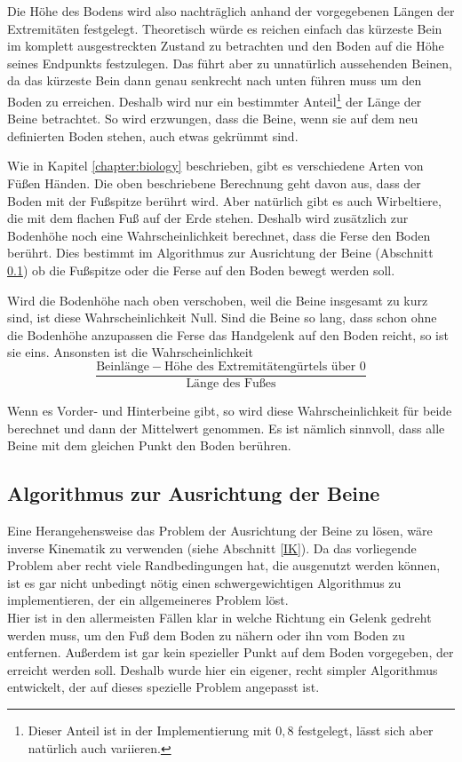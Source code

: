 Die Höhe des Bodens wird also nachträglich anhand der vorgegebenen Längen der Extremitäten festgelegt.
Theoretisch würde es reichen einfach das kürzeste Bein im komplett ausgestreckten Zustand zu betrachten und den Boden auf die Höhe seines Endpunkts festzulegen.
Das führt aber zu unnatürlich aussehenden Beinen, da das kürzeste Bein dann genau senkrecht nach unten führen muss um den Boden zu erreichen.
Deshalb wird nur ein bestimmter Anteil\footnote{Dieser Anteil ist in der Implementierung mit $0{,}8$ festgelegt, lässt sich aber natürlich auch variieren.} der Länge der Beine betrachtet. So wird erzwungen, dass die Beine, wenn sie auf dem neu definierten Boden stehen, auch etwas gekrümmt sind.

Wie in Kapitel \ref{chapter:biology} beschrieben, gibt es verschiedene Arten von Füßen \bzw Händen. Die oben beschriebene Berechnung geht davon aus, dass der Boden mit der Fußspitze berührt wird. Aber natürlich gibt es auch Wirbeltiere, die mit dem flachen Fuß auf der Erde stehen.
Deshalb wird zusätzlich zur Bodenhöhe noch eine Wahrscheinlichkeit berechnet, dass die Ferse den Boden berührt. Dies bestimmt im Algorithmus zur Ausrichtung der Beine (Abschnitt \ref{leg_algo}) ob die Fußspitze oder die Ferse auf den Boden bewegt werden soll.

Wird die Bodenhöhe nach oben verschoben, weil die Beine insgesamt zu kurz sind, ist diese Wahrscheinlichkeit Null.
Sind die Beine so lang, dass schon ohne die Bodenhöhe anzupassen die Ferse \bzw das Handgelenk auf den Boden reicht, so ist sie eins.
Ansonsten ist die Wahrscheinlichkeit 
\[\frac{\text{Beinlänge} - \text{Höhe des Extremitätengürtels über }0}{\text{Länge des Fußes}}\]

Wenn es Vorder- und Hinterbeine gibt, so wird diese Wahrscheinlichkeit für beide berechnet und dann der Mittelwert genommen. Es ist nämlich sinnvoll, dass alle Beine mit dem gleichen Punkt den Boden berühren.


\subsection{Algorithmus zur Ausrichtung der Beine}
\label{leg_algo}

Eine Herangehensweise das Problem der Ausrichtung der Beine zu lösen, wäre inverse Kinematik zu verwenden (siehe Abschnitt \ref{IK}). 
Da das vorliegende Problem aber recht viele Randbedingungen hat, die ausgenutzt werden können, ist es gar nicht unbedingt nötig einen schwergewichtigen Algorithmus zu implementieren, der ein allgemeineres Problem löst.\\
Hier ist \zb in den allermeisten Fällen klar in welche Richtung ein Gelenk gedreht werden muss, um den Fuß dem Boden zu nähern oder ihn vom Boden zu entfernen. Außerdem ist gar kein spezieller Punkt auf dem Boden vorgegeben, der erreicht werden soll.
Deshalb wurde hier ein eigener, recht simpler Algorithmus entwickelt, der auf dieses spezielle Problem angepasst ist.

